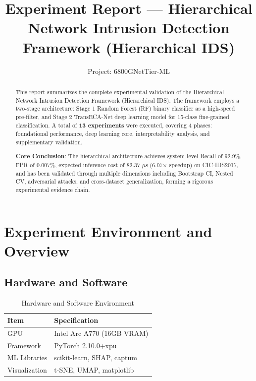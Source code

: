 \documentclass[sigconf]{acmart}
\begin{document}
\title{Experiment Report --- Hierarchical Network Intrusion Detection Framework (Hierarchical IDS)}

\author{Project: 6800GNetTier-ML}
\affiliation{%
  \institution{}
  \country{}
}

\begin{abstract}
This report summarizes the complete experimental validation of the Hierarchical Network Intrusion Detection Framework (Hierarchical IDS). The framework employs a two-stage architecture: Stage 1 Random Forest (RF) binary classifier as a high-speed pre-filter, and Stage 2 TransECA-Net deep learning model for 15-class fine-grained classification. A total of \textbf{13 experiments} were executed, covering 4 phases: foundational performance, deep learning core, interpretability analysis, and supplementary validation.

\textbf{Core Conclusion}: The hierarchical architecture achieves system-level Recall of 92.9\%, FPR of 0.007\%, expected inference cost of 82.37 $\mu$s (6.07$\times$ speedup) on CIC-IDS2017, and has been validated through multiple dimensions including Bootstrap CI, Nested CV, adversarial attacks, and cross-dataset generalization, forming a rigorous experimental evidence chain.
\end{abstract}

\maketitle

\section{Experiment Environment and Overview}

\subsection{Hardware and Software}

\begin{table}[!h]
\caption{Hardware and Software Environment}
\label{tab:hardware}
\begin{tabular}{ll}
\toprule
\textbf{Item} & \textbf{Specification} \\
\midrule
GPU & Intel Arc A770 (16GB VRAM) \\
Framework & PyTorch 2.10.0+xpu \\
ML Libraries & scikit-learn, SHAP, captum \\
Visualization & t-SNE, UMAP, matplotlib \\
\bottomrule
\end{tabular}
\end{table}
\end{document}
